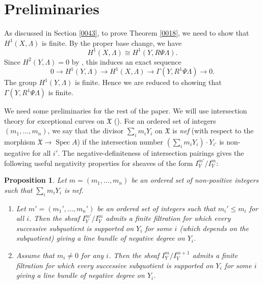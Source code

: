 \documentclass{amsart}
\newtheorem{Prop}[Thm]{Proposition}
\theoremstyle{remark}
\numberwithin{equation}{section}
\DeclareMathOperator{\Spec}{Spec}
\begin{document}

\section{Preliminaries}
\label{0034}

As discussed in Section \ref{0043},
to prove Theorem \ref{0018},
we need to show that $H^{1}(X, \Lambda)$ is finite.
By the proper base change, we have
	\[
			H^{1}(X, \Lambda)
		\cong
			H^{1}(Y, R \Psi \Lambda).
	\]
Since $H^{2}(Y, \Lambda) = 0$ by \cite[Chapter VI, Remark 1.5 (b)]{Mil80},
this induces an exact sequence
	\[
			0
		\to
			H^{1}(Y, \Lambda)
		\to
			H^{1}(X, \Lambda)
		\to
			\Gamma(Y, R^{1} \Psi \Lambda)
		\to
			0.
	\]
The group $H^{1}(Y, \Lambda)$ is finite.
Hence we are reduced to showing that
$\Gamma(Y, R^{1} \Psi \Lambda)$ is finite.

We need some preliminaries for the rest of the paper.
We will use intersection theory for exceptional curves on $\mathfrak{X}$
(\cite[Section 13]{Lip69}).
For an ordered set of integers $(m_{1}, \dots, m_{n})$,
we say that the divisor $\sum_{i} m_{i} Y_{i}$ on $\mathfrak{X}$ is \emph{nef}
(with respect to the morphism $\mathfrak{X} \to \Spec A$)
if the intersection number
$(\sum_{i} m_{i} Y_{i}) \cdot Y_{i'}$ is non-negative for all $i'$.
The negative-definiteness of intersection pairings
gives the following useful negativity properties for sheaves of the form $I_{Y}^{m'} / I_{Y}^{m}$:

\begin{Prop} \label{0049}
	Let $m = (m_{1}, \dots, m_{n})$ be
	an ordered set of non-positive integers
	such that $\sum_{i} m_{i} Y_{i}$ is nef.
	\begin{enumerate}
		\item \label{0050}
			Let $m' = (m_{1}', \dots, m_{n}')$ be an ordered set of integers
			such that $m_{i}' \le m_{i}$ for all $i$.
			Then the sheaf $I_{Y}^{m'} / I_{Y}^{m}$ admits a finite filtration
			for which every successive subquotient is supported on $Y_{i}$ for some $i$
			(which depends on the subquotient)
			giving a line bundle of negative degree on $Y_{i}$.
		\item \label{0051}
			Assume that $m_{i} \ne 0$ for any $i$.
			Then the sheaf $I_{Y}^{m} / I_{Y}^{m + 1}$ admits a finite filtration
			for which every successive subquotient is supported on $Y_{i}$ for some $i$
			giving a line bundle of negative degree on $Y_{i}$.
	\end{enumerate}
\end{Prop}
\end{document}
